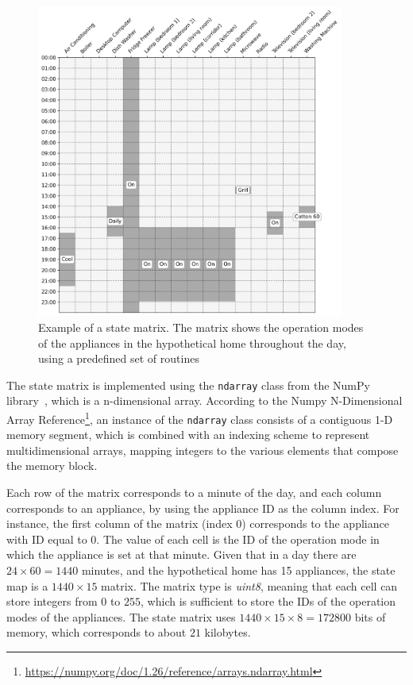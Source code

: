 \begin{figure}
    \centering
    \includegraphics[width=0.9\textwidth]{images/real_matrix.png}
    \caption[Example of a state matrix]{Example of a state matrix. The matrix shows the operation modes of the appliances in the hypothetical home throughout the day, using a predefined set of routines}%
    \label{fig:state_matrix}
\end{figure}

The state matrix is implemented using the \texttt{ndarray} class from the NumPy library~\parencite{harrisArrayProgrammingNumPy2020}, which is a n-dimensional array. According to the Numpy N-Dimensional Array Reference\footnote{\url{https://numpy.org/doc/1.26/reference/arrays.ndarray.html}}, an instance of the \texttt{ndarray} class consists of a contiguous 1-D memory segment, which is combined with an indexing scheme to represent multidimensional arrays, mapping integers to the various elements that compose the memory block.

Each row of the matrix corresponds to a minute of the day, and each column corresponds to an appliance, by using the appliance ID as the column index. For instance, the first column of the matrix (index \(0\)) corresponds to the appliance with ID equal to \(0\). The value of each cell is the ID of the operation mode in which the appliance is set at that minute. Given that in a day there are \(24 \times 60 = 1440\) minutes, and the hypothetical home has 15 appliances, the state map is a \(1440 \times 15\) matrix. The matrix type is \textit{uint8}, meaning that each cell can store integers from \(0\) to \(255\), which is sufficient to store the IDs of the operation modes of the appliances. The state matrix uses \(1440 \times 15 \times 8 = 172800\) bits of memory, which corresponds to about \(21\) kilobytes.

